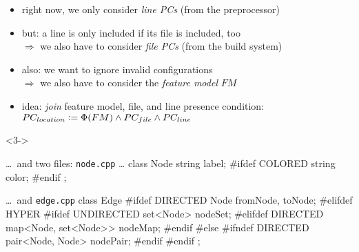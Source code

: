 \begin{frame}[fragile]{\myframetitle}
	\begin{fancycolumns}[widths={67,33},animation=none]
		\begin{note}{}
			\begin{itemize}
				\item right now, we only consider \emph{line PCs} (from the preprocessor)
				\item but: a line is only included if its file is included, too\\
					$\Rightarrow$ we also have to consider \emph{file PCs} (from the build system)
				\item also: we want to ignore invalid configurations\\
					$\Rightarrow$ we also have to consider the \emph{feature model} $FM$
				\item idea: \emph{join} feature model, file, and line presence condition:\\
					$PC_{location} \vcentcolon= \Phi(FM) \wedge PC_{file} \wedge PC_{line}$
			\end{itemize}
		\end{note}
	\nextcolumn
		\begin{uncoverenv}<3->
			\begin{cpptight}[basicstyle=\tiny]{\ldots\ and two files: \texttt{node.cpp} \ldots}
class Node {
	string label;
#ifdef COLORED
	string color;
#endif
};
			\end{cpptight}
			\begin{cpptight}[basicstyle=\tiny]{\ldots\ and \texttt{edge.cpp}}
class Edge {
#ifdef DIRECTED
	Node fromNode, toNode;
#elifdef HYPER
#ifdef UNDIRECTED
	set<Node> nodeSet;
#elifdef DIRECTED
	map<Node, set<Node>> nodeMap;
#endif
#else
#ifndef DIRECTED
	pair<Node, Node> nodePair;
#endif
#endif
};
			\end{cpptight}
		\end{uncoverenv}
	\end{fancycolumns}
\end{frame}

